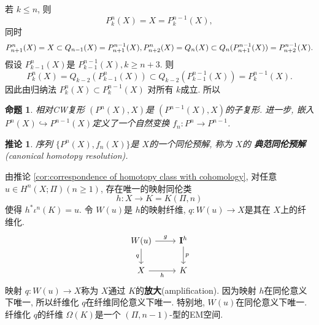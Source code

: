\documentclass{ctexart}
\theoremstyle{plain}
\newtheorem{proposition}[theorem]{命题}
\newtheorem{corollary}[theorem]{推论}
\theoremstyle{definition}
\renewcommand{\emph}{\textbf}
\begin{document}
        若 $k\le n$, 则 
        \begin{equation*}
          P^{n}_{k}(X)=X=P_{k}^{n-1}(X),
        \end{equation*}
        同时
        \begin{equation*}
          P^{n}_{n+1}(X)=X \subset Q_{n-1}(X)=P^{n-1}_{n+1}(X), \\
          P^{n}_{n+2}(X)=Q_{n}(X)\subset Q_{n}(P^{n-1}_{n+1}(X))=P_{n+2}^{n-1}(X).
        \end{equation*}
        假设 $P^{n}_{k-1}(X)$是 $P^{n-1}_{k-1}(X),k\ge n+3$. 则 
        \begin{equation*}
          P^{n}_{k}(X)=Q_{k-2}(P^{n}_{k-1}(X))\subset Q_{k-2}(P^{n-1}_{k-1}(X))=P^{n-1}_{k}(X).
        \end{equation*}
        因此由归纳法 $P^{n}_{k}(X)\subset P^{n-1}_{k}(X)$ 对所有 $k$成立. 所以 
        \begin{proposition}
            相对CW复形 $(P^{n}(X),X)$是 $(P^{n-1}(X),X)$的子复形. 进一步, 嵌入 $P^{n}(X)\hookrightarrow P^{n-1}(X)$定义了一个自然变换 $f_{n}:P^{n}\to P^{n-1}$.
        \end{proposition}

        \begin{corollary}
            序列 $\{P^{n}(X),f_{n}(X)\}$是 $X$的一个同伦预解, 称为 $X$的 \emph{典范同伦预解}(canonical homotopy resolution).
        \end{corollary}

        由推论 \ref{cor:correspondence of homotopy class with cohomology}, 对任意 $u \in H^{n}(X;\Pi)(n\ge 1)$, 存在唯一的映射同伦类
        \begin{equation*}
          h:X\to K=K(\Pi,n)
        \end{equation*}
        使得 $h^{*}\iota^{n}(K)=u$. 令 $W(u)$是 $h$的映射纤维, $q:W(u)\to X$是其在 $X$上的纤维化. 
        \begin{equation*}
          \begin{tikzcd}
            W(u) \arrow[d, "q"'] \arrow[r, "g"] & \mathbf{I}^{h} \arrow[d, "p"] \\
            X \arrow[r, "h"'] & K
          \end{tikzcd}
        \end{equation*}
        映射 $q:W(u)\to X$称为 $X$通过 $K$的\emph{放大}(amplification). 因为映射 $h$在同伦意义下唯一, 所以纤维化 $q$在纤维同伦意义下唯一. 特别地, $W(u)$在同伦意义下唯一. 纤维化 $q$的纤维 $\Omega(K)$是一个 $(\Pi,n-1)$-型的EM空间.
\end{document}
